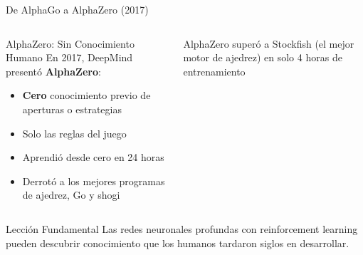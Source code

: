 \documentclass[aspectratio=169]{beamer}
\begin{document}
\begin{frame}{De AlphaGo a AlphaZero (2017)}
    \begin{columns}
        \begin{alertblock}{AlphaZero: Sin Conocimiento Humano}
            En 2017, DeepMind presentó \textbf{AlphaZero}:
            \begin{itemize}
                \item \textbf{Cero} conocimiento previo de aperturas o estrategias
                \item Solo las reglas del juego
                \item Aprendió desde cero en 24 horas
                \item Derrotó a los mejores programas de ajedrez, Go y shogi
            \end{itemize}
        \end{alertblock}
        
        \centering
        
        \vspace{0.2cm}
        \scriptsize AlphaZero superó a Stockfish (el mejor motor de ajedrez) en solo 4 horas de entrenamiento
    \end{columns}
    
    \vspace{0.3cm}
    \begin{exampleblock}{Lección Fundamental}
        Las redes neuronales profundas con reinforcement learning pueden descubrir conocimiento que los humanos tardaron siglos en desarrollar.
    \end{exampleblock}
\end{frame}
\end{document}
